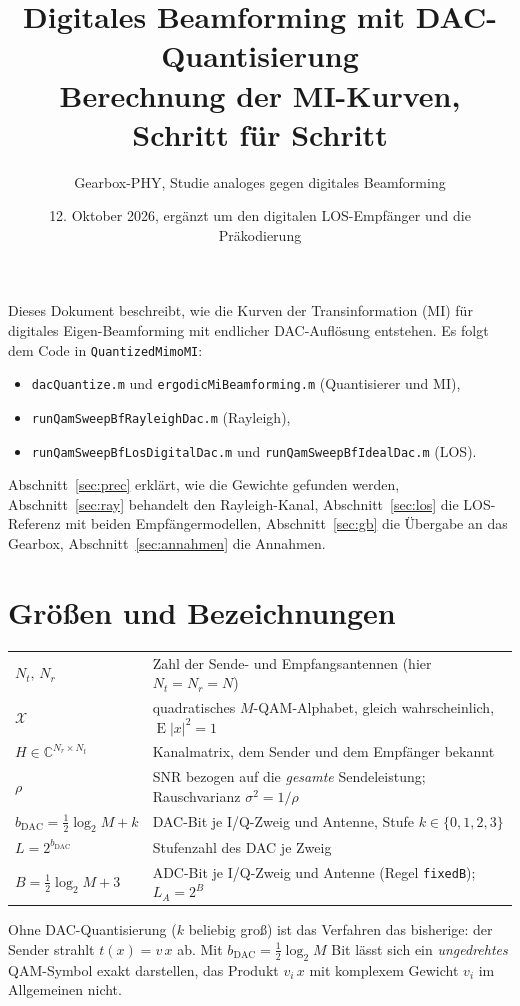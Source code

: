 \documentclass[11pt,a4paper]{article}
\title{\textbf{Digitales Beamforming mit DAC-Quantisierung}\\[0.3em]
\large Berechnung der MI-Kurven, Schritt für Schritt}
\author{Gearbox-PHY, Studie analoges gegen digitales Beamforming}
\date{12. Oktober 2026, ergänzt um den digitalen LOS-Empfänger und die Präkodierung}
\newcommand{\E}{\operatorname{E}}
\newcommand{\file}[1]{\texttt{#1}}
\begin{document}
\maketitle

\noindent Dieses Dokument beschreibt, wie die Kurven der Transinformation (MI) für digitales
Eigen-Beamforming mit endlicher DAC-Auflösung entstehen. Es folgt dem Code in
\file{QuantizedMimoMI}:
\begin{itemize}[leftmargin=1.4em,itemsep=0.05em,topsep=0.2em]
\item \file{dacQuantize.m} und \file{ergodicMiBeamforming.m} (Quantisierer und MI),
\item \file{runQamSweepBfRayleighDac.m} (Rayleigh),
\item \file{runQamSweepBfLosDigitalDac.m} und \file{runQamSweepBfIdealDac.m} (LOS).
\end{itemize}
Abschnitt~\ref{sec:prec} erklärt, wie die Gewichte gefunden werden, Abschnitt~\ref{sec:ray}
behandelt den Rayleigh-Kanal, Abschnitt~\ref{sec:los} die LOS-Referenz mit beiden
Empfängermodellen, Abschnitt~\ref{sec:gb} die Übergabe an das Gearbox,
Abschnitt~\ref{sec:annahmen} die Annahmen.

\section{Größen und Bezeichnungen}

\begin{tabular}{@{}ll@{}}
$N_t,\,N_r$ & Zahl der Sende- und Empfangsantennen (hier $N_t=N_r=N$)\\
$\mathcal X$ & quadratisches $M$-QAM-Alphabet, gleich wahrscheinlich, $\E|x|^2=1$\\
$H\in\mathbb C^{N_r\times N_t}$ & Kanalmatrix, dem Sender und dem Empfänger bekannt\\
$\rho$ & SNR bezogen auf die \emph{gesamte} Sendeleistung; Rauschvarianz $\sigma^2=1/\rho$\\
$b_{\mathrm{DAC}}=\tfrac12\log_2M+k$ & DAC-Bit je I/Q-Zweig und Antenne, Stufe $k\in\{0,1,2,3\}$\\
$L=2^{b_{\mathrm{DAC}}}$ & Stufenzahl des DAC je Zweig\\
$B=\tfrac12\log_2M+3$ & ADC-Bit je I/Q-Zweig und Antenne (Regel \file{fixedB}); $L_A=2^B$\\
\end{tabular}

Ohne DAC-Quantisierung ($k$ beliebig groß) ist das Verfahren das bisherige: der Sender strahlt
$t(x)=v\,x$ ab. Mit $b_{\mathrm{DAC}}=\tfrac12\log_2M$ Bit lässt sich ein \emph{ungedrehtes}
QAM-Symbol exakt darstellen, das Produkt $v_i\,x$ mit komplexem Gewicht $v_i$ im Allgemeinen nicht.
\end{document}
